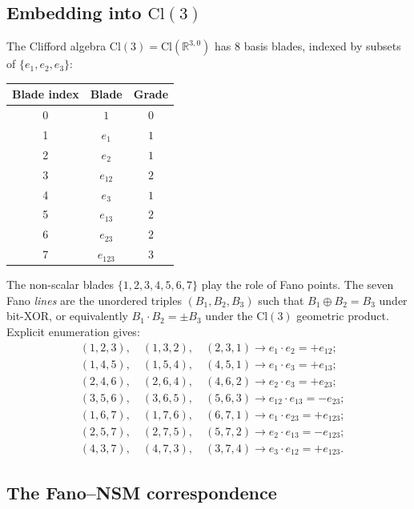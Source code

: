 \documentclass[11pt,a4paper]{article}
\theoremstyle{plain}
\theoremstyle{definition}
\theoremstyle{remark}
\numberwithin{equation}{section}
\providecommand{\Cl}{\mathrm{Cl}}
\providecommand{\RR}{\mathbb{R}}
\begin{document}
\subsection{Embedding into $\Cl(3)$}

The Clifford algebra $\Cl(3) = \Cl(\RR^{3,0})$ has $8$ basis
blades, indexed by subsets of $\{e_1, e_2, e_3\}$:
\begin{center}
\begin{tabular}{ccc}
\toprule
Blade index & Blade & Grade \\
\midrule
0 & $1$ & $0$ \\
1 & $e_1$ & $1$ \\
2 & $e_2$ & $1$ \\
3 & $e_{12}$ & $2$ \\
4 & $e_3$ & $1$ \\
5 & $e_{13}$ & $2$ \\
6 & $e_{23}$ & $2$ \\
7 & $e_{123}$ & $3$ \\
\bottomrule
\end{tabular}
\end{center}
The non-scalar blades $\{1, 2, 3, 4, 5, 6, 7\}$ play the role of
Fano points.  The seven Fano \emph{lines} are the unordered triples
$(B_1, B_2, B_3)$ such that $B_1 \oplus B_2 = B_3$ under bit-XOR, or
equivalently $B_1 \cdot B_2 = \pm B_3$ under the $\Cl(3)$ geometric
product.  Explicit enumeration gives:
\begin{equation}\label{eq:cl3-fano-lines}
\begin{aligned}
&(1, 2, 3),\quad (1, 3, 2),\quad (2, 3, 1) \to e_1 \cdot e_2 = +e_{12};\\
&(1, 4, 5),\quad (1, 5, 4),\quad (4, 5, 1) \to e_1 \cdot e_3 = +e_{13};\\
&(2, 4, 6),\quad (2, 6, 4),\quad (4, 6, 2) \to e_2 \cdot e_3 = +e_{23};\\
&(3, 5, 6),\quad (3, 6, 5),\quad (5, 6, 3) \to e_{12} \cdot e_{13} = -e_{23};\\
&(1, 6, 7),\quad (1, 7, 6),\quad (6, 7, 1) \to e_1 \cdot e_{23} = +e_{123};\\
&(2, 5, 7),\quad (2, 7, 5),\quad (5, 7, 2) \to e_2 \cdot e_{13} = -e_{123};\\
&(4, 3, 7),\quad (4, 7, 3),\quad (3, 7, 4) \to e_3 \cdot e_{12} = +e_{123}.
\end{aligned}
\end{equation}

\subsection{The Fano--NSM correspondence}
\end{document}
